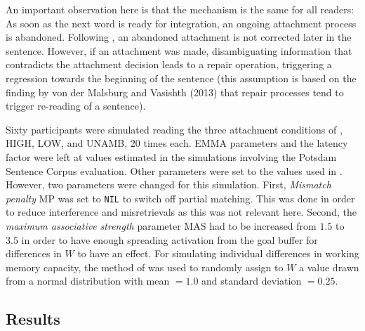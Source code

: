 \documentclass{cambridge7A}\usepackage[]{graphicx}\usepackage[]{color}
\begin{document}
An important observation here is that the mechanism is the same for all readers: As soon as the next word is ready for integration, an ongoing attachment process is abandoned.  
Following \cite{SwetsDesmetClifton2008}, an abandoned attachment is not corrected later in the sentence. However, if an attachment was made, disambiguating information that contradicts the attachment decision leads to a repair operation, triggering a regression towards the beginning of the sentence (this assumption is based on the finding by von der Malsburg and Vasishth (2013) that repair processes tend to trigger re-reading of a sentence).

Sixty participants were simulated reading the three attachment conditions of \cite{MalsburgVasishth2013}, HIGH, LOW, and UNAMB, 20 times each.
EMMA parameters and the latency factor were left at values estimated in the simulations involving the Potsdam Sentence Corpus evaluation. Other parameters were set to the values used in \cite{LewisVasishth2005}. However, two parameters were changed for this simulation. First, \emph{Mismatch penalty} MP was set to \texttt{NIL} to switch off partial matching. This was done in order to reduce interference and misretrievals as this was not relevant here. Second, the \emph{maximum associative strength} parameter MAS had to be increased from $1.5$ to $3.5$ in order to have enough spreading activation from the goal buffer for differences in $W$ to have an effect.
For simulating individual differences in working memory capacity, the method of \cite{DailyLovettReder2001} was used to randomly assign to $W$ a value drawn from a normal distribution with mean $=1.0$ and standard deviation $=0.25$. 

\subsection{Results}
\end{document}
